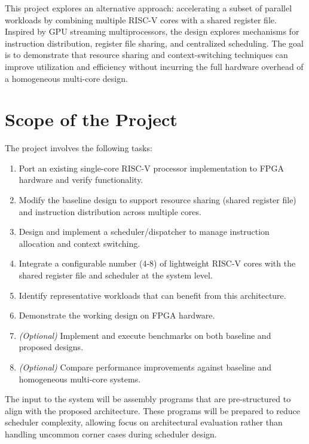 \documentclass[12pt,letterpaper]{report}
\theoremstyle{definition}
\theoremstyle{plain}
\begin{document}
This project explores an alternative approach: accelerating a subset of parallel workloads by 
combining multiple RISC-V cores with a shared register file. 
Inspired by GPU streaming multiprocessors, the design explores mechanisms for 
instruction distribution, register file sharing, and centralized scheduling. 
The goal is to demonstrate that resource sharing and context-switching techniques 
can improve utilization and efficiency without incurring the full hardware 
overhead of a homogeneous multi-core design.


\section{Scope of the Project}

The project involves the following tasks:
\begin{enumerate}[leftmargin=*]
    \item Port an existing single-core RISC-V processor implementation to FPGA hardware and verify functionality.
    \item Modify the baseline design to support resource sharing (shared register file) and instruction distribution across multiple cores.
    \item Design and implement a scheduler/dispatcher to manage instruction allocation and context switching.
    \item Integrate a configurable number (4-8) of lightweight RISC-V cores with the shared register file and scheduler at the system level.
    \item Identify representative workloads that can benefit from this architecture.
    \item Demonstrate the working design on FPGA hardware.
    \item \textit{(Optional)} Implement and execute benchmarks on both baseline and proposed designs.
    \item \textit{(Optional)} Compare performance improvements against baseline and homogeneous multi-core systems.
\end{enumerate}

\begin{warningbox}[title=Input Specification]
The input to the system will be assembly programs that are pre-structured to align 
with the proposed architecture. These programs will be prepared to reduce scheduler 
complexity, allowing focus on architectural evaluation rather than handling uncommon 
corner cases during scheduler design.
\end{warningbox}
\end{document}
